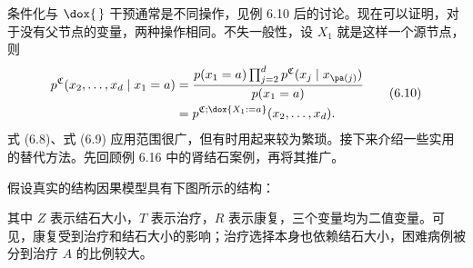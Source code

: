 条件化与 $\dox{\,}$ 干预通常是不同操作，见例 6.10 后的讨论。现在可以证明，对于没有父节点的变量，两种操作相同。不失一般性，设 $X_1$ 就是这样一个源节点，则
\begin{equation}
 \begin{aligned}
 p^{\mathfrak C}(x_2,\ldots,x_d\mid x_1=a)
 &=\frac{p(x_1=a)\prod_{j=2}^d p^{\mathfrak C}(x_j\mid x_{\pa(j)})}{p(x_1=a)}\\
 &=p^{\mathfrak C;\dox{X_1:=a}}(x_2,\ldots,x_d).
 \end{aligned}
 \tag{6.10}
\end{equation}
式 (6.8)、式 (6.9) 应用范围很广，但有时用起来较为繁琐。接下来介绍一些实用的替代方法。先回顾例 6.16 中的肾结石案例，再将其推广。

\begin{example}[肾结石，续]
假设真实的结构因果模型具有下图所示的结构：
\begin{center}
\end{center}
其中 $Z$ 表示结石大小，$T$ 表示治疗，$R$ 表示康复，三个变量均为二值变量。可见，康复受到治疗和结石大小的影响；治疗选择本身也依赖结石大小，困难病例被分到治疗 $A$ 的比例较大。


\end{example}

